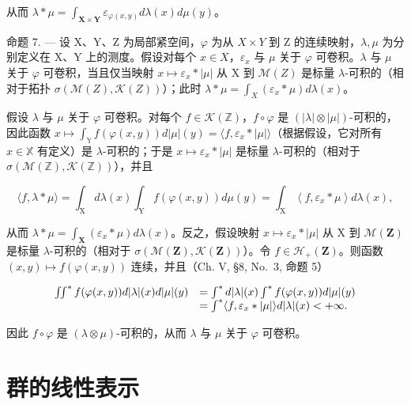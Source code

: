 从而 \(\lambda * \mu = \int_{\mathbf{X} \times \mathbf{Y}} \varepsilon_{\varphi(x, y)} d\lambda(x) d\mu(y)\)。

命题 7. --- 设 X、Y、Z 为局部紧空间，\(\varphi\) 为从 \(X \times Y\) 到 Z 的连续映射，\(\lambda, \mu\) 为分别定义在 X、Y 上的测度。假设对每个 \(x \in X\)，\(\varepsilon_x\) 与 \(\mu\) 关于 \(\varphi\) 可卷积。\(\lambda\) 与 \(\mu\) 关于 \(\varphi\) 可卷积，当且仅当映射 \(x \mapsto \varepsilon_x * |\mu|\) 从 X 到 \(\mathcal{M}(Z)\) 是标量 \(\lambda\)-可积的（相对于拓扑 \(\sigma(\mathcal{M}(Z), \mathcal{K}(Z))\)）；此时 \(\lambda * \mu = \int_{X} (\varepsilon_x * \mu) d\lambda(x)\)。

假设 \(\lambda\) 与 \(\mu\) 关于 \(\varphi\) 可卷积。对每个 \(f \in \mathcal{K}(\mathbb{Z})\)，\(f \circ \varphi\) 是 \((|\lambda| \otimes |\mu|)\)-可积的，因此函数 \(x \mapsto \int_{\mathbb{Y}} f(\varphi(x, y)) d|\mu|(y) = \langle f, \varepsilon_x * |\mu| \rangle\)（根据假设，它对所有 \(x \in \mathbb{X}\) 有定义）是 \(\lambda\)-可积的；于是 \(x \mapsto \varepsilon_x * |\mu|\) 是标量 \(\lambda\)-可积的（相对于 \(\sigma(\mathcal{M}(\mathbb{Z}), \mathcal{K}(\mathbb{Z}))\)），并且

\[
\langle f, \lambda * \mu \rangle = \int_ {\mathrm{X}} d \lambda (x) \int_ {\mathrm{Y}} f (\varphi (x, y)) d \mu (y) = \int_ {\mathrm{X}} \left\langle f, \varepsilon_ {x} * \mu \right\rangle d \lambda (x),
\]

从而 \(\lambda * \mu = \int_{\mathbf{X}} (\varepsilon_x * \mu) d\lambda(x)\)。反之，假设映射 \(x \mapsto \varepsilon_x * |\mu|\) 从 X 到 \(\mathcal{M}(\mathbf{Z})\) 是标量 \(\lambda\)-可积的（相对于 \(\sigma(\mathcal{M}(\mathbf{Z}), \mathcal{K}(\mathbf{Z}))\)）。令 \(f \in \mathcal{H}_+(\mathbf{Z})\)。则函数 \((x,y) \mapsto f(\varphi(x,y))\) 连续，并且（Ch. V, §8, No.~3, 命题 5）

\[
\begin{array}{r l} \iint^ {*} f (\varphi (x, y)) d | \lambda | (x) d | \mu | (y) & = \int^ {*} d | \lambda | (x) \int^ {*} f (\varphi (x, y)) d | \mu | (y) \\ & = \int^ {*} \langle f, \varepsilon_ {x} * | \mu | \rangle d | \lambda | (x) <   + \infty . \end{array}
\]

因此 \(f \circ \varphi\) 是 \((\lambda \otimes \mu)\)-可积的，从而 \(\lambda\) 与 \(\mu\) 关于 \(\varphi\) 可卷积。

\section{群的线性表示}

